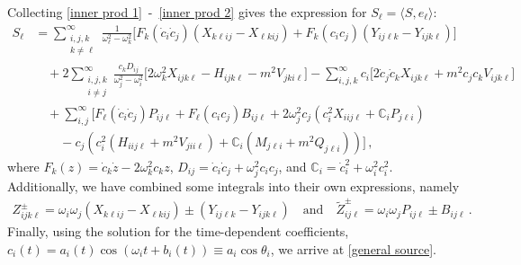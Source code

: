 \documentclass[letterpaper,11pt]{article}
\newcommand{\oi}{\omega_i}
\newcommand{\oj}{\omega_j}
\newcommand{\ok}{\omega_k}
\newcommand{\ol}{\omega_\ell}
\begin{document}
Collecting \eqref{inner prod 1}~\!-~\!\eqref{inner prod 2} gives the expression for $S_\ell = \langle S, e_\ell \rangle$:
\begin{align}
\label{S intermediate}
S_\ell &= \sum_{\substack{i, j, k \\ k \neq \ell}}^\infty \frac{1}{\ol^2 - \ok^2} \Big[ F_k(\dot c_i \dot c_j) \left(X_{k\ell i j} - X_{\ell k i j} \right) + F_k(c_i c_j) \left(Y_{ij\ell k} - Y_{ijk\ell} \right) \Big] \nonumber \\
%
& \quad +2 \sum_{\substack{i,j,k \\ i \neq j}}^\infty \frac{c_k D_{ij}}{\oj^2 - \oi^2} \Big[  2\ok^2 X_{ijk\ell} - H_{ijk\ell} -m^2 V_{jki\ell} \Big] - \sum_{i,j,k}^\infty c_i \Big[ 2 \dot c_j \dot c_k X_{ijk\ell} + m^2 c_j c_k V_{ijk\ell} \Big] \nonumber \\ 
%
& \quad + \sum_{i,j}^\infty \Big[ F_\ell (\dot c_i \dot c_j) P_{ij\ell} + F_\ell (c_i c_j) B_{ij\ell} + 2\oj^2 c_j \left( c_i^2 X_{iij\ell} + \mathbb C_i P_{j\ell i} \right) \nonumber \\
%
& \qquad - c_j \left( c^2_i (H_{iij\ell} + m^2 V_{jii\ell} ) + \mathbb C_i (M_{j\ell i} + m^2 Q_{j\ell i}) \right) \Big] \, ,
\end{align}
where $F_k(z) = \dot c_k \dot z - 2\ok^2 c_k z$, $D_{ij} = \dot c_i \dot c_j + \omega^2_j c_i c_j$, and $\mathbb C_i = \dot c_i^2 + \oi^2 c_i^2$. Additionally, we have combined some integrals into their own expressions, namely
\begin{align}
Z^{\pm}_{ijk\ell} = \oi \oj \left( X_{k\ell ij} - X_{\ell kij} \right) \pm \left( Y_{ij\ell k} - Y_{ijk\ell} \right) \quad \text{and} \quad \tilde Z^{\pm}_{ij\ell} = \oi \oj P_{ij\ell} \pm B_{ij\ell} \, .
\end{align}
Finally, using the solution for the time-dependent coefficients, $c_i(t) = a_i(t) \cos \left( \omega_i t + b_i (t) \right) \equiv a_i \cos \theta_i$, we arrive at \eqref{general source}.
\end{document}
